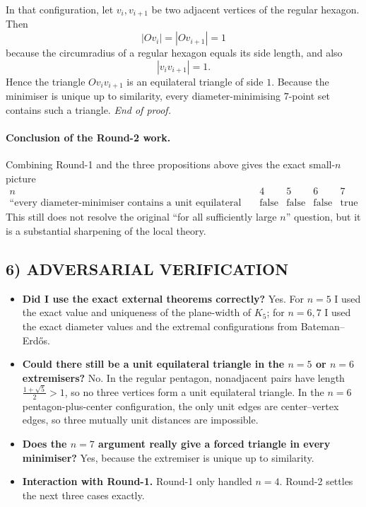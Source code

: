 In that configuration, let $v_i,v_{i+1}$ be two adjacent vertices of the regular hexagon.
Then
\[
|Ov_i|=|Ov_{i+1}|=1
\]
because the circumradius of a regular hexagon equals its side length, and also
\[
|v_i v_{i+1}|=1.
\]
Hence the triangle $Ov_i v_{i+1}$ is an equilateral triangle of side $1$.
Because the minimiser is unique up to similarity, every diameter-minimising $7$-point set contains such a triangle. \hfill\emph{End of proof.}

\paragraph{Conclusion of the Round-2 work.}
Combining Round-1 and the three propositions above gives the exact small-$n$ picture
\[
\begin{array}{c|cccc}
n & 4 & 5 & 6 & 7\\
\hline
\text{``every diameter-minimiser contains a unit equilateral triangle''} &
\text{false} & \text{false} & \text{false} & \text{true}
\end{array}
\]
This still does not resolve the original ``for all sufficiently large $n$'' question, but it is a substantial sharpening of the local theory.

\subsection*{6) ADVERSARIAL VERIFICATION}

\begin{itemize}
\item \textbf{Did I use the exact external theorems correctly?} Yes. For $n=5$ I used the exact value and uniqueness of the plane-width of $K_5$; for $n=6,7$ I used the exact diameter values and the extremal configurations from Bateman--Erd\H{o}s.
\item \textbf{Could there still be a unit equilateral triangle in the $n=5$ or $n=6$ extremisers?} No. In the regular pentagon, nonadjacent pairs have length $\frac{1+\sqrt5}{2}>1$, so no three vertices form a unit equilateral triangle. In the $n=6$ pentagon-plus-center configuration, the only unit edges are center--vertex edges, so three mutually unit distances are impossible.
\item \textbf{Does the $n=7$ argument really give a forced triangle in every minimiser?} Yes, because the extremiser is unique up to similarity.
\item \textbf{Interaction with Round-1.} Round-1 only handled $n=4$. Round-2 settles the next three cases exactly.
\end{itemize}

